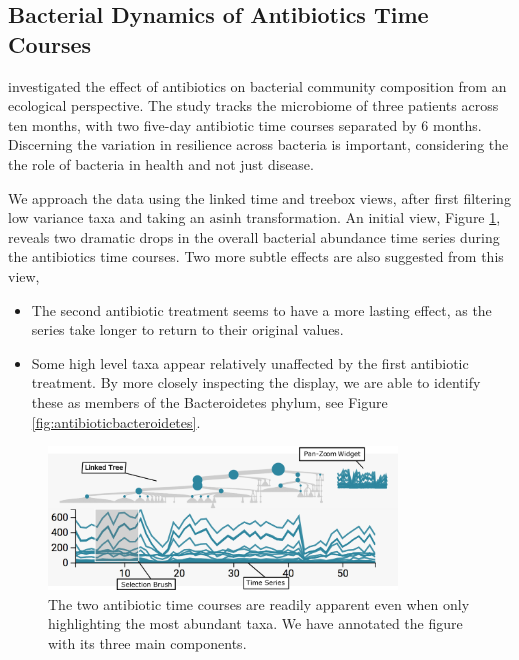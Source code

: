 \documentclass[12pt]{article}
\begin{document}
\subsection{Bacterial Dynamics of Antibiotics Time
Courses}\label{bacterial-dynamics-of-antibiotics-time-courses}

\citet{dethlefsen2008pervasive} investigated the effect of antibiotics on
bacterial community composition from an ecological perspective. The study tracks
the microbiome of three patients across ten months, with two five-day antibiotic
time courses separated by 6 months. Discerning the variation in resilience
across bacteria is important, considering the the role of bacteria in health and
not just disease.

We approach the data using the linked time and treebox views, after first
filtering low variance taxa and taking an \(\text{asinh}\) transformation. An
initial view, Figure \ref{fig:antibioticoverview}, reveals two dramatic drops in
the overall bacterial abundance time series during the antibiotics time courses.
Two more subtle effects are also suggested from this view,

\begin{itemize}
\item
  The second antibiotic treatment seems to have a more lasting effect,
  as the series take longer to return to their original values.
\item
  Some high level taxa appear relatively unaffected by the first
  antibiotic treatment. By more closely inspecting the display, we are
  able to identify these as members of the Bacteroidetes phylum, see
  Figure \ref{fig:antibioticbacteroidetes}.
\end{itemize}

\begin{figure}

{\centering \includegraphics[width=350px]{figure/annotated_antibiotic_overview}

}

\caption{The two antibiotic time courses are readily apparent even when only
  highlighting the most abundant taxa. We have annotated the figure with its
  three main components.}\label{fig:antibioticoverview}
\end{figure}
\end{document}
